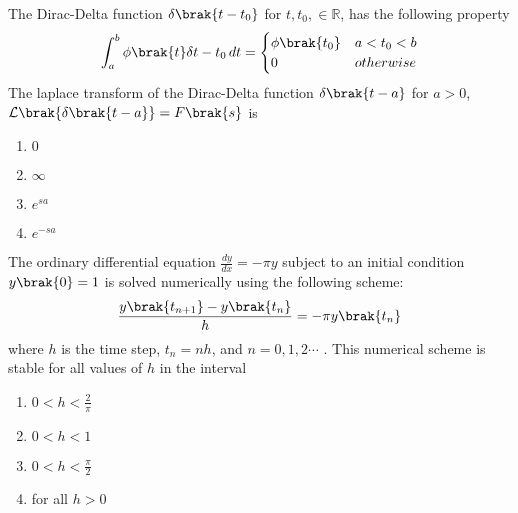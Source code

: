     \item The Dirac-Delta function $\delta\brak{t -t_0}$ for $t, t_0, \in \mathbb{R}$, has the following
        property 
        \begin{align}
            \int_a^b \phi\brak{t}\delta{t - t_0} \, dt = \begin{cases}
                \phi\brak{t_0} & a < t_0 < b\\
                0 & otherwise
            \end{cases} 
        \end{align}
        The laplace transform of the Dirac-Delta function $\delta\brak{t - a}$ for $a > 0$, 
        $\mathcal{L}\brak{\delta\brak{t - a}} = F\brak{s}$ is 
        \hfill{}
        \begin{multicols}{4}
            \begin{enumerate}
                \item $0$
                    \columnbreak
                \item $\infty$
                    \columnbreak
                \item $e^{sa}$
                    \columnbreak
                \item $e^{-sa}$
            \end{enumerate}
        \end{multicols}
    \item The ordinary differential equation $\frac{dy}{dx} = -\pi y$ subject to an initial condition
        $y\brak{0} = 1$ is solved numerically using the following scheme:
        \begin{align}
            \frac{y\brak{t_{n+1}} - y\brak{t_n}}{h} = -\pi y\brak{t_n} 
        \end{align}
        where $h$ is the time step, $t_n = nh$, and $n = 0, 1, 2 \cdots$ . This numerical scheme
        is stable for all values of $h$ in the interval
        \hfill{}
        \begin{multicols}{4}
            \begin{enumerate}
                \item $0 < h < \frac{2}{\pi}$
                    \columnbreak
                \item $0 < h < 1$
                    \columnbreak
                \item $0 < h < \frac{\pi}{2}$
                    \columnbreak
                \item for all $h > 0$
            \end{enumerate}
        \end{multicols}

